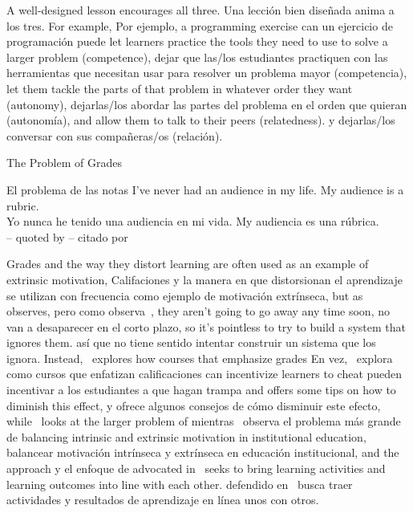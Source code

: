 A well-designed lesson encourages all three.
Una lección bien diseñada anima a los tres.
For example,
Por ejemplo,
a programming exercise can
un ejercicio de programación puede
let learners practice the tools they need to use to solve a larger problem (competence),
dejar que las/los estudiantes practiquen con las herramientas que necesitan usar para resolver un problema mayor (competencia),
let them tackle the parts of that problem in whatever order they want (autonomy),
dejarlas/los abordar las partes del problema en el orden que quieran (autonomía),
and allow them to talk to their peers (relatedness).
y dejarlas/los conversar con sus compañeras/os (relación).

\begin{aside}{The Problem of Grades}
\begin{aside}{El problema de las notas}
  I've never had an audience in my life. My audience is a rubric.\\
  Yo nunca he tenido una audiencia en mi vida. My audiencia es una rúbrica.\\
  -- quoted by 
  -- citado por 

  Grades and the way they distort learning are often used as an example of extrinsic motivation,
  Califaciones y la manera en que distorsionan el aprendizaje se utilizan con frecuencia como ejemplo de motivación extrínseca,
  but as~\cite{Mill2016a} observes,
  pero como observa~\cite{Mill2016a},
  they aren't going to go away any time soon,
  no van a desaparecer en el corto plazo,
  so it's pointless to try to build a system that ignores them.
  así que no tiene sentido intentar construir un sistema que los ignora.
  Instead,~\cite{Lang2013} explores how courses that emphasize grades
  En vez,~\cite{Lang2013} explora como cursos que enfatizan calificaciones
  can incentivize learners to cheat
  pueden incentivar a los estudiantes a que hagan trampa
  and offers some tips on how to diminish this effect,
  y ofrece algunos consejos de cómo disminuir este efecto,
  while~\cite{Covi2017} looks at the larger problem of
  mientras~\cite{Covi2017} observa el problema más grande de
  balancing intrinsic and extrinsic motivation in institutional education,
  balancear motivación intrínseca y extrínseca en educación institucional,
  and the  approach
  y el enfoque de 
  advocated in~\cite{Bigg2011} seeks to bring learning activities and learning outcomes
  into line with each other.
  defendido en~\cite{Bigg2011} busca traer actividades y resultados de aprendizaje en línea unos con otros.
\end{aside}
\end{aside}


